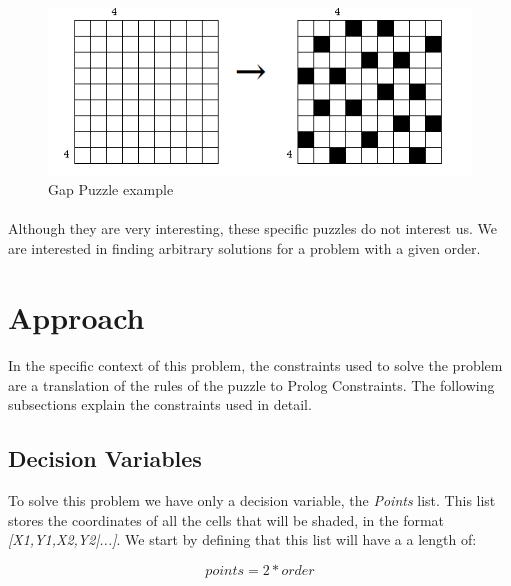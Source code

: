 \documentclass[runningheads]{llncs}
\begin{document}
\begin{figure}
    \begin{center}
        \includegraphics[scale=0.5]{images/figure1.png}
        \caption{Gap Puzzle example} \label{fig1}
    \end{center}
\end{figure}
    
\paragraph{}
Although they are very interesting, these specific puzzles do not interest us. We are interested in finding arbitrary 
solutions for a problem with a given order.

\pagebreak

\section{Approach}
\paragraph{}
In the specific context of this problem, the constraints used to solve the problem are a translation of the rules of 
the puzzle to Prolog Constraints. The following subsections explain the constraints used in detail.

\subsection{Decision Variables}
To solve this problem we have only a decision variable, the \textit{Points} list. This list stores the coordinates of all
the cells that will be shaded, in the format \textit{[X1,Y1,X2,Y2|...]}. We start by defining that this list will have a 
a length of:

\begin{equation}
    points = 2 * order
\end{equation}
\end{document}
